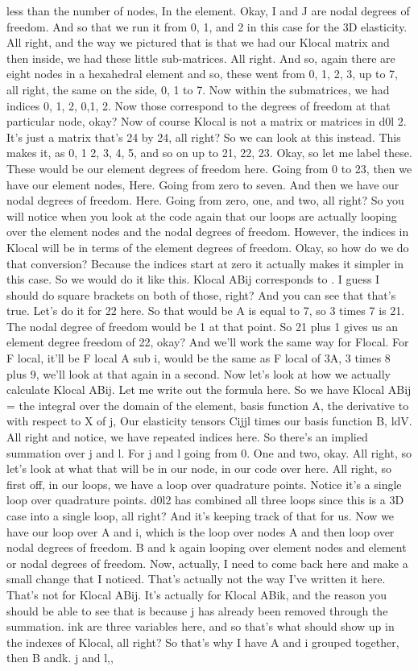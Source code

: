\documentclass[10pt]{article}
\begin{document}
less than the number of nodes, In the element. Okay, I and J are nodal degrees of freedom. And so that we run it from 0, 1, and 2 in this case for the 3D elasticity. All right, and the way we pictured that is that we had our Klocal matrix and then inside, we had these little sub-matrices. All right. And so, again there are eight nodes in a hexahedral element and so, these went from 0, 1, 2, 3, up to 7, all right, the same on the side, 0, 1 to 7. Now within the submatrices, we had indices 0, 1, 2, 0,1, 2. Now those correspond to the degrees of freedom at that particular node, okay? Now of course Klocal is not a matrix or matrices in d0l 2. It's just a matrix that's 24 by 24, all right? So we can look at this instead. This makes it, as 0, 1 2, 3, 4, 5, and so on up to 21, 22, 23. Okay, so let me label these. These would be our element degrees of freedom here. Going from 0 to 23, then we have our element nodes, Here. Going from zero to seven. And then we have our nodal degrees of freedom. Here. Going from zero, one, and two, all right? So you will notice when you look at the code again that our loops are actually looping over the element nodes and the nodal degrees of freedom. However, the indices in Klocal will be in terms of the element degrees of freedom. Okay, so how do we do that conversion? Because the indices start at zero it actually makes it simpler in this case. So we would do it like this. Klocal ABij corresponds to . I guess I should do square brackets on both of those, right? And you can see that that's true. Let's do it for 22 here. So that would be A is equal to 7, so 3 times 7 is 21. The nodal degree of freedom would be 1 at that point. So 21 plus 1 gives us an element degree freedom of 22, okay? And we'll work the same way for Flocal. For F local, it'll be F local A sub i, would be the same as F local of 3A, 3 times 8 plus 9, we'll look at that again in a second. Now let's look at how we actually calculate Klocal ABij. Let me write out the formula here. So we have Klocal ABij = the integral over the domain of the element, basis function A, the derivative to with respect to X of j, Our elasticity tensors Cijjl times our basis function B, ldV. All right and notice, we have repeated indices here. So there's an implied summation over j and l. For j and l going from 0. One and two, okay. All right, so let's look at what that will be in our node, in our code over here. All right, so first off, in our loops, we have a loop over quadrature points. Notice it's a single loop over quadrature points. d0l2 has combined all three loops since this is a 3D case into a single loop, all right? And it's keeping track of that for us. Now we have our loop over A and i, which is the loop over nodes A and then loop over nodal degrees of freedom. B and k again looping over element nodes and element or nodal degrees of freedom. Now, actually, I need to come back here and make a small change that I noticed. That's actually not the way I've written it here. That's not for Klocal ABij. It's actually for Klocal ABik, and the reason you should be able to see that is because j has already been removed through the summation. ink are three variables here, and so that's what should show up in the indexes of Klocal, all right? So that's why I have A and i grouped together, then B andk. j and l,, 
\end{document}
